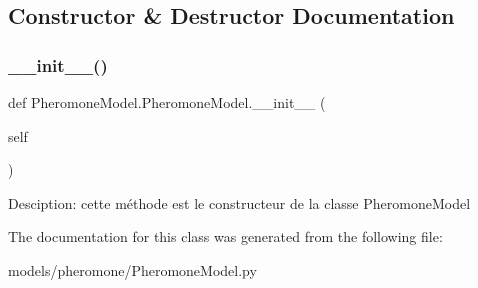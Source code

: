 \subsection{Constructor \& Destructor Documentation}
\mbox{\label{class_pheromone_model_1_1_pheromone_model_a7d692c818254359644c81f058dc89ba0}} 
\subsubsection{\texorpdfstring{\+\_\+\+\_\+init\+\_\+\+\_\+()}{\_\_init\_\_()}}
{\footnotesize\ttfamily def Pheromone\+Model.\+Pheromone\+Model.\+\_\+\+\_\+init\+\_\+\+\_\+ (\begin{DoxyParamCaption}\item[{}]{self }\end{DoxyParamCaption})}

\begin{DoxyVerb}Desciption: cette méthode est le constructeur de la classe PheromoneModel
\end{DoxyVerb}
 

The documentation for this class was generated from the following file\+:\begin{DoxyCompactItemize}
\item 
models/pheromone/Pheromone\+Model.\+py\end{DoxyCompactItemize}
